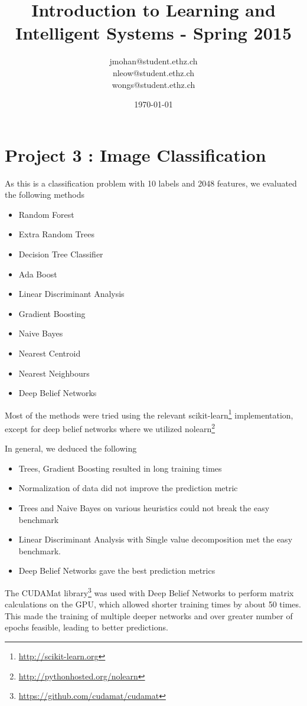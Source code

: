 \documentclass[a4paper, 11pt]{article}
\title{Introduction to Learning and Intelligent Systems - Spring 2015}
\author{jmohan@student.ethz.ch\\ nleow@student.ethz.ch\\ wongs@student.ethz.ch\\}
\date{\today}
\begin{document}
\maketitle

\section*{Project 3 : Image Classification}

As this is a classification problem with 10 labels and 2048 features, we evaluated the following methods

\begin{itemize}
  \item Random Forest
  \item Extra Random Trees
  \item Decision Tree Classifier
  \item Ada Boost
  \item Linear Discriminant Analysis
  \item Gradient Boosting
  \item Naive Bayes
  \item Nearest Centroid
  \item Nearest Neighbours
  \item Deep Belief Networks
\end{itemize}

Most of the methods were tried using the relevant scikit-learn\footnote{\url{http://scikit-learn.org}} implementation, except for deep belief networks where we utilized nolearn\footnote{\url{http://pythonhosted.org/nolearn}}

In general, we deduced the following
\begin{itemize}
  \item Trees, Gradient Boosting resulted in long training times
  \item Normalization of data did not improve the prediction metric
  \item Trees and Naive Bayes on various heuristics could not break the easy benchmark
  \item Linear Discriminant Analysis with Single value decomposition met the easy benchmark.
  \item Deep Belief Networks gave the best prediction metrics
\end{itemize}

The CUDAMat library\footnote{\url{https://github.com/cudamat/cudamat}} was used with Deep Belief Networks to perform matrix calculations on the GPU, which allowed shorter training times by about 50 times. This made the training of multiple deeper networks and over greater number of epochs feasible, leading to better predictions.
\end{document}

